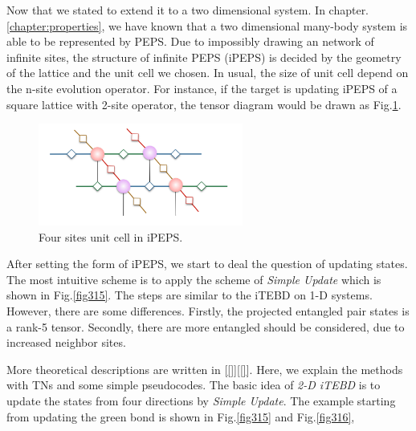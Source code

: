 Now that we stated to extend it to a two dimensional system. In chapter.\ref{chapter:properties}, we have known that a two dimensional many-body system is able to be represented by PEPS. Due to impossibly drawing an network of infinite sites, the structure of infinite PEPS (iPEPS) is decided by the geometry of the lattice and the unit cell we chosen. In usual, the size of unit cell depend on the n-site evolution operator. For instance, if the target is updating iPEPS of a square lattice with 2-site operator, the tensor diagram would be drawn as Fig.\ref{fig314}.

\begin{figure}[ht]
	\centering
	\includegraphics[width=0.6\textwidth]{figures/fig314.png}
	\caption[The tensor diagrams of 2-D lattice]{Four sites unit cell in iPEPS.}
	\label{fig314}
\end{figure}

After setting the form of iPEPS, we start to deal the question of updating states. The most intuitive scheme is to apply the scheme of \textit{Simple Update} which is shown in Fig.\ref{fig315}. The steps are similar to the iTEBD on 1-D systems. However, there are some differences. Firstly, the projected entangled pair states is a rank-5 tensor. Secondly, there are more entangled should be considered, due to increased neighbor sites.

More theoretical descriptions are written in [\ref{}][\ref{}]. Here, we explain the methods with TNs and some simple pseudocodes. The basic idea of \textit{2-D iTEBD} is to update the states from four directions by \textit{Simple Update}. The example starting from updating the green bond is shown in Fig.\ref{fig315} and Fig.\ref{fig316},

